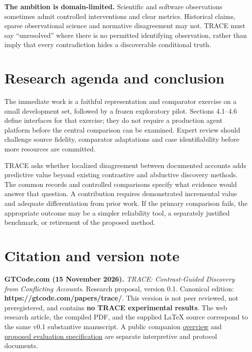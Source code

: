\documentclass[11pt,a4paper]{article}
\begin{document}
\textbf{The ambition is domain-limited.} Scientific and software
observations sometimes admit controlled interventions and clear metrics.
Historical claims, sparse observational science and normative
disagreement may not. TRACE must say ``unresolved'' where there is no
permitted identifying observation, rather than imply that every
contradiction hides a discoverable conditional truth.

\section{Research agenda and
conclusion}\label{research-agenda-and-conclusion}

The immediate work is a faithful representation and comparator exercise
on a small development set, followed by a frozen exploratory pilot.
Sections 4.1--4.6 define interfaces for that exercise; they do not
require a production agent platform before the central comparison can be
examined. Expert review should challenge source fidelity, comparator
adaptations and case identifiability before more resources are
committed.

TRACE asks whether localized disagreement between documented accounts
adds predictive value beyond existing contrastive and abductive
discovery methods. The common records and controlled comparisons specify
what evidence would answer that question. A contribution requires
demonstrated incremental value and adequate differentiation from prior
work. If the primary comparison fails, the appropriate outcome may be a
simpler reliability tool, a separately justified benchmark, or
retirement of the proposed method.

\section{Citation and version note}\label{citation-and-version-note}

\textbf{GTCode.com (15 November 2026).} \emph{TRACE: Contrast-Guided
Discovery from Conflicting Accounts}. Research proposal, version 0.1.
Canonical edition: \textbf{https://gtcode.com/papers/trace/}. This
version is not peer reviewed, not preregistered, and contains \textbf{no
TRACE experimental results}. The web research article, the compiled PDF,
and the supplied LaTeX source correspond to the same v0.1 substantive
manuscript. A public companion
\href{https://gtcode.com/guides/trace/overview/}{overview} and
\href{https://gtcode.com/guides/trace/evaluation/}{proposed evaluation
specification} are separate interpretive and protocol documents.



\end{document}

